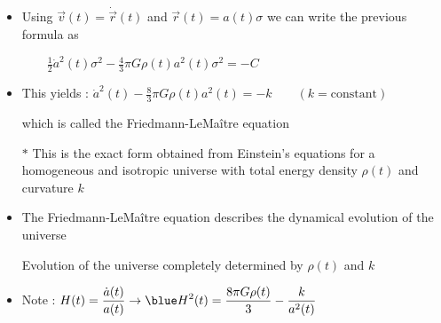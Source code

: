\Tr
\begin{itemize}
\item Using {\blue $\vec{v}(t)=\dot{\vec{r}}(t)$} and {\blue $\vec{r}(t)=a(t)\sigma$}
      we can write the previous formula as
\item[] $\qquad \frac{1}{2}\dot{a}^{2}(t)\sigma^{2}-\frac{4}{3}\pi G\rho(t)a^{2}(t)\sigma^{2}=-C$
\item This yields :  $\dot{a}^{2}(t)-\frac{8}{3}\pi G\rho(t)a^{2}(t)=-k \qquad (k=\text{constant})$ 
\item[] which is called the {\blue Friedmann-LeMa\^{i}tre equation}
\item[] \begin{center}
        {\red {}}
        \end{center}
\item[$\ast$] This is the exact form obtained from Einstein's equations for a homogeneous and isotropic
              universe with {\blue total energy density $\rho(t)$} and {\blue curvature $k$}
\item The Friedmann-LeMa\^{i}tre equation describes the dynamical evolution of the universe
\item[] {\red Evolution of the universe completely determined by $\rho(t)$ and $k$}
\item Note : $\displaystyle H(t)=\frac{\dot{a}(t)}{a(t)} \rightarrow
              {\blue H^{2}(t)=\frac{8\pi G\rho(t)}{3}-\frac{k}{a^{2}(t)}}$
\end{itemize}